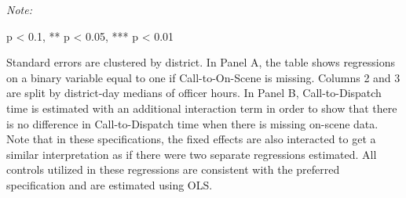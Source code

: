 \begin{table}[H]
\begin{threeparttable}
\begin{tablenotes}
\item \textit{Note: } 
\item * p < 0.1, ** p < 0.05, *** p < 0.01
\item Standard errors are clustered by district. In Panel A,                      the table shows regressions on a binary variable equal to                      one if Call-to-On-Scene is missing. Columns 2 and 3 are split by                      district-day medians of officer hours. In Panel B, Call-to-Dispatch                      time is estimated with an additional interaction term in order to show                      that there is no difference in Call-to-Dispatch time when there is                       missing on-scene data. Note that in these specifications, the fixed effects                      are also interacted to get a similar interpretation as if there were two separate                      regressions estimated. All controls utilized in these regressions                      are consistent with the preferred specification and are estimated                      using OLS.                  
\end{tablenotes}
\end{threeparttable}
\end{table}
